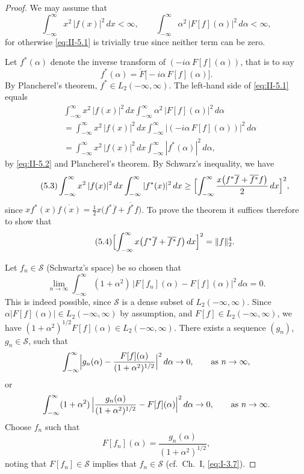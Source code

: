 \begin{proof}
We may assume that
\[
\int_{-\infty}^{\infty}x^{2}\,|f(x)|^{2}\,dx<\infty,\qquad
\int_{-\infty}^{\infty}\alpha^{2}\,|F[f](\alpha)|^{2}\,d\alpha<\infty,
\]
for otherwise \eqref{eq:II-5.1} is trivially true since neither term can be zero.

Let $f^{*}(\alpha)$ denote the inverse transform of $(-i\alpha\,F[f](\alpha))$, that is to say
\begin{equation}\tag{5.2}\label{eq:II-5.2}
f^{*}(\alpha)=\check F\bigl[-i\alpha\,F[f](\alpha)\bigr].
\end{equation}
By Plancherel's theorem, $f^{*}\in L_{2}(-\infty,\infty)$. The left-hand side of \eqref{eq:II-5.1} equals
\[
\begin{aligned}
& \int_{-\infty}^{\infty}x^{2}\,|f(x)|^{2}\,dx  \int_{-\infty}^{\infty}\alpha^{2}\,|F[f](\alpha)|^{2}\,d\alpha\\
&= \int_{-\infty}^{\infty}x^{2}\,|f(x)|^{2}\,dx  \int_{-\infty}^{\infty}  \bigl|(-i\alpha\,F[f](\alpha))\bigr|^{2}\,d\alpha\\
&= \int_{-\infty}^{\infty}x^{2}\,|f(x)|^{2}\,dx
\int_{-\infty}^{\infty}|f^{*}(\alpha)|^{2}\,d\alpha,
\end{aligned}
\]
by \eqref{eq:II-5.2} and Plancherel's theorem. By Schwarz's inequality, we have
\begin{equation}\tag{5.3}\label{eq:II-5.3}
\int_{-\infty}^{\infty}x^{2}\,|f(x)|^{2}\,dx
\int_{-\infty}^{\infty}|f^{*}(x)|^{2}\,dx
\ge \Bigl[\int_{-\infty}^{\infty}\frac{x\bigl(f^{*}\overline{f}+\overline{f^{*}}f\bigr)}{2}\,dx\Bigr]^{2},
\end{equation}
since $x f^{*}(x)\overline{f(x)}=\frac{1}{2}x\bigl(f^{*}\overline{f}+\overline{f^{*}}f\bigr)$. To prove the theorem it suffices therefore to show that
\begin{equation}\tag{5.4}\label{eq:II-5.4}
\Bigl[\int_{-\infty}^{\infty}x\bigl(f^{*}\overline{f}+\overline{f^{*}}f\bigr)\,dx\Bigr]^{2}=\|f\|_{2}^{4}.
\end{equation}

Let $f_{n}\in\mathcal S$ (Schwartz's space) be so chosen that
\begin{equation}\tag{5.5}\label{eq:II-5.5}
\lim_{n\to\infty}\int_{-\infty}^{\infty}(1+\alpha^{2})\,
\bigl|F[f_{n}](\alpha)-F[f](\alpha)\bigr|^{2}\,d\alpha=0.
\end{equation}
This is indeed possible, since $\mathcal S$ is a dense subset of $L_{2}(-\infty,\infty)$. Since $\alpha|F[f](\alpha)|\in L_{2}(-\infty,\infty)$ by assumption, and $F[f]\in L_{2}(-\infty,\infty)$, we have $(1+\alpha^{2})^{1/2}F[f](\alpha)\in L_{2}(-\infty,\infty)$. There exists a sequence $(g_{n})$, $g_{n}\in\mathcal S$, such that
\[
\int_{-\infty}^{\infty}\Bigl|g_{n}(\alpha)-\frac{F[f](\alpha)}{(1+\alpha^{2})^{1/2}}\Bigr|^{2}\,d\alpha\to 0,\qquad\text{as }n\to\infty,
\]
or
\[
\int_{-\infty}^{\infty}(1+\alpha^{2})\,
\Bigl|\frac{g_{n}(\alpha)}{(1+\alpha^{2})^{1/2}}-F[f](\alpha)\Bigr|^{2}\,d\alpha\to 0,\qquad\text{as }n\to\infty.
\]
Choose $f_{n}$ such that
\[
F[f_{n}](\alpha)=\frac{g_{n}(\alpha)}{(1+\alpha^{2})^{1/2}},
\]
noting that $F[f_{n}]\in\mathcal S$ implies that $f_{n}\in\mathcal S$ (cf.\ Ch.~I, \eqref{eq:I-3.7}).


\end{proof}
